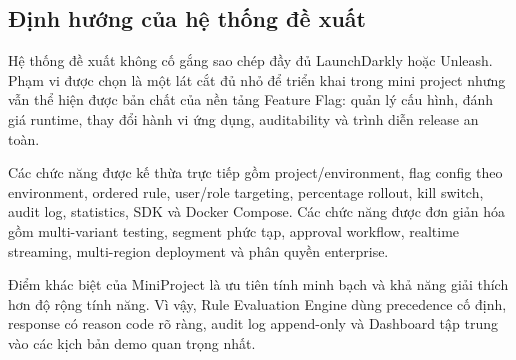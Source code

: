 \subsection{Định hướng của hệ thống đề xuất}

Hệ thống đề xuất không cố gắng sao chép đầy đủ LaunchDarkly hoặc Unleash. Phạm vi được chọn là một lát cắt đủ nhỏ để triển khai trong mini project nhưng vẫn thể hiện được bản chất của nền tảng Feature Flag: quản lý cấu hình, đánh giá runtime, thay đổi hành vi ứng dụng, auditability và trình diễn release an toàn.

Các chức năng được kế thừa trực tiếp gồm project/environment, flag config theo environment, ordered rule, user/role targeting, percentage rollout, kill switch, audit log, statistics, SDK và Docker Compose. Các chức năng được đơn giản hóa gồm multi-variant testing, segment phức tạp, approval workflow, realtime streaming, multi-region deployment và phân quyền enterprise.

Điểm khác biệt của MiniProject là ưu tiên tính minh bạch và khả năng giải thích hơn độ rộng tính năng. Vì vậy, Rule Evaluation Engine dùng precedence cố định, response có reason code rõ ràng, audit log append-only và Dashboard tập trung vào các kịch bản demo quan trọng nhất.
